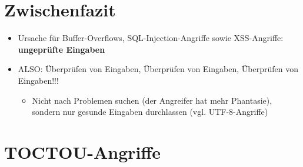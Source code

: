 \documentclass[openany]{book}
\begin{document}
\section{Zwischenfazit}

\begin{itemize}
    \item Ursache für Buffer-Overflows, SQL-Injection-Angriffe sowie XSS-Angriffe: \textbf{ungeprüfte Eingaben}
    \item ALSO: Überprüfen von Eingaben, Überprüfen von Eingaben, Überprüfen von Eingaben!!!
    \begin{itemize}
        \item Nicht nach Problemen suchen (der Angreifer hat mehr Phantasie), sondern nur gesunde Eingaben durchlassen (vgl. UTF-8-Angriffe)
    \end{itemize} 
\end{itemize}

\section{TOCTOU-Angriffe}
\end{document}

